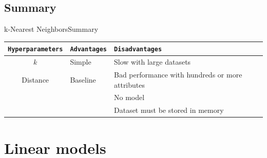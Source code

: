 \documentclass[10pt,compress]{beamer} %
\begin{document}
\subsection{Summary}
\begin{frame}{k-Nearest Neighbors}{Summary}
	\begin{center}
	\begin{tabular}{cp{3cm}p{3cm}}\hline
	 	\texttt{Hyperparameters}  & \texttt{Advantages}  & \texttt{Disadvantages} \\\hline
	 	$k$                       & Simple               & Slow with large datasets  \\
	 	Distance                  & Baseline             & Bad performance with hundreds or more attributes  \\
                                  &                      & No model \\
                                  &                      & Dataset must be stored in memory \\
	 	\hline
	\end{tabular}
	\end{center}
\end{frame}

\section{Linear models}
\end{document}
